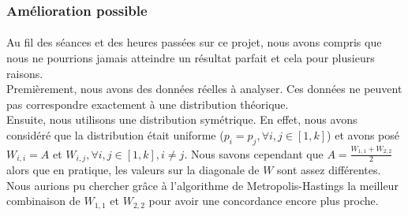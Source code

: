 \subsubsection*{Amélioration possible}
\paragraph*{}
Au fil des séances et des heures passées sur ce projet, nous avons compris que nous ne pourrions jamais 
atteindre un résultat parfait et cela pour plusieurs raisons. \\
Premièrement, nous avons des données réelles à analyser. Ces données ne peuvent pas correspondre exactement
à une distribution théorique. \\
Ensuite, nous utilisons une distribution symétrique. En effet, nous avons considéré que la distribution
était uniforme ($p_i = p_j ,\forall i,j \in[1,k]$) et avons posé $W_{i,i}=A$ et $W_{i,j},\forall i,j \in [1,k] ,i \ne j$.
Nous savons cependant que $A = \frac{W_{1,1}+W_{2,2}}{2}$ alors que en pratique, les valeurs sur la diagonale de $W$
sont assez différentes. Nous aurions pu chercher grâce à l'algorithme de Metropolis-Hastings la meilleur combinaison de 
$W_{1,1}$ et $W_{2,2}$ pour avoir une concordance encore plus proche. 